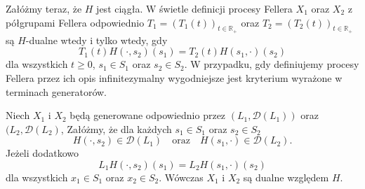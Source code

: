 \documentclass{article}
\begin{document}
	Załóżmy teraz, że $H$ jest ciągła.
	W świetle definicji procesy Fellera $X_1$ oraz $X_2$ z półgrupami Fellera odpowiednio 
	$T_1=(T_1(t))_{t \in \mathbb{R}_+}$ oraz $T_2=(T_2(t))_{t \in \mathbb{R}_+}$
	są $H$-dualne wtedy i tylko wtedy, gdy
	\begin{equation*}
		T_1(t)H(\cdot, s_2)(s_1) = T_2(t)H(s_1, \cdot) (s_2)
	\end{equation*}
	dla wszystkich $t \geq 0$, $s_1\in S_1$ oraz $s_2 \in S_2$. W przypadku,
	gdy definiujemy procesy Fellera przez ich opis infinitezymalny wygodniejsze jest kryterium
	wyrażone w terminach generatorów.

	\begin{thm}\label{thm:3.42} 
		Niech $X_1$ i $X_2$ będą generowane odpowiednio przez $(L_1, \mathcal{D}(L_1))$ 
		oraz $(L_2, \mathcal{D}(L_2)$,
		Załóżmy, że dla każdych $s_1\in S_1$ oraz $s_2 \in S_2$
		\begin{equation*}
			H(\cdot, s_2) \in \mathcal{D}(L_1) \quad \mbox{oraz} 
			\quad H(s_1, \cdot) \in \mathcal{D}(L_2).
		\end{equation*}
		Jeżeli dodatkowo
		\begin{equation*}
			L_1 H(\cdot, s_2)(s_1) = L_2 H(s_1, \cdot)(s_2)
		\end{equation*}
		dla wszystkich $x_1 \in S_1$ oraz $x_2 \in S_2$. 
		Wówczas $X_1$ i $X_2$ są dualne względem $H$.
	\end{thm}
\end{document}
